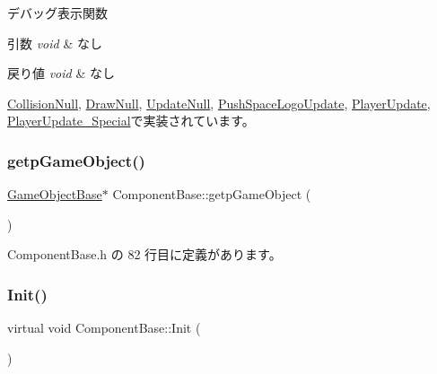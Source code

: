 デバッグ表示関数 


\begin{DoxyParams}{引数}
{\em void} & なし \\
\hline
\end{DoxyParams}

\begin{DoxyRetVals}{戻り値}
{\em void} & なし \\
\hline
\end{DoxyRetVals}


\mbox{\hyperlink{class_collision_null_a3ee0dacfb13c949538519f39d2f6fb0f}{Collision\+Null}}, \mbox{\hyperlink{class_draw_null_a2921257342eca07c8f6db4c475959f77}{Draw\+Null}}, \mbox{\hyperlink{class_update_null_a77aee1e614cf6dafe4f9af58b2205e4b}{Update\+Null}}, \mbox{\hyperlink{class_push_space_logo_update_ab18a0c905455da17f9e2f1fe5f0c34e6}{Push\+Space\+Logo\+Update}}, \mbox{\hyperlink{class_player_update_ac15fd0faf356c6e66f6c62c2b6b8d3ac}{Player\+Update}}, \mbox{\hyperlink{class_player_update___special_a6253000b53b2c5bc73ce0ed4d3b4a82a}{Player\+Update\+\_\+\+Special}}で実装されています。

\mbox{\label{class_component_base_a558f69e072f0dfedaf9416cf1a903db5}} 
\subsubsection{\texorpdfstring{getp\+Game\+Object()}{getpGameObject()}}
{\footnotesize\ttfamily \mbox{\hyperlink{class_game_object_base}{Game\+Object\+Base}}$\ast$ Component\+Base\+::getp\+Game\+Object (\begin{DoxyParamCaption}{ }\end{DoxyParamCaption})\hspace{0.3cm}{\ttfamily [inline]}}



 Component\+Base.\+h の 82 行目に定義があります。

\mbox{\label{class_component_base_a125939d6befe42f28886a6523e86b18b}} 
\subsubsection{\texorpdfstring{Init()}{Init()}}
{\footnotesize\ttfamily virtual void Component\+Base\+::\+Init (\begin{DoxyParamCaption}{ }\end{DoxyParamCaption})\hspace{0.3cm}{\ttfamily [pure virtual]}}



